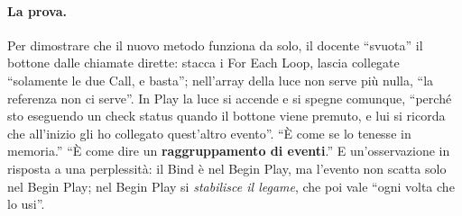 \paragraph{La prova.} Per dimostrare che il nuovo metodo funziona da solo, il docente
``svuota'' il bottone dalle chiamate dirette: stacca i For Each Loop, lascia collegate
``solamente le due Call, e basta''; nell'array della luce non serve più nulla, ``la
referenza non ci serve''. In Play la luce si accende e si spegne comunque, ``perché sto
eseguendo un check status quando il bottone viene premuto, e lui si ricorda che
all'inizio gli ho collegato quest'altro evento''. ``È come se lo tenesse in memoria.''
``È come dire un \textbf{raggruppamento di eventi}.'' E un'osservazione in risposta a una
perplessità: il Bind è nel Begin Play, ma l'evento non scatta solo nel Begin Play; nel
Begin Play si \emph{stabilisce il legame}, che poi vale ``ogni volta che lo usi''.


